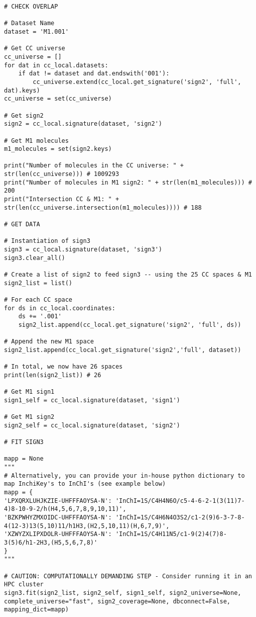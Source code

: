 \begin{lstlisting}
# CHECK OVERLAP

# Dataset Name
dataset = 'M1.001'

# Get CC universe
cc_universe = []
for dat in cc_local.datasets:
    if dat != dataset and dat.endswith('001'):
        cc_universe.extend(cc_local.get_signature('sign2', 'full', dat).keys)
cc_universe = set(cc_universe)

# Get sign2
sign2 = cc_local.signature(dataset, 'sign2')

# Get M1 molecules
m1_molecules = set(sign2.keys)

print("Number of molecules in the CC universe: " + str(len(cc_universe))) # 1009293
print("Number of molecules in M1 sign2: " + str(len(m1_molecules))) # 200
print("Intersection CC & M1: " + str(len(cc_universe.intersection(m1_molecules)))) # 188

# GET DATA

# Instantiation of sign3
sign3 = cc_local.signature(dataset, 'sign3')
sign3.clear_all()

# Create a list of sign2 to feed sign3 -- using the 25 CC spaces & M1
sign2_list = list()

# For each CC space
for ds in cc_local.coordinates:
    ds += '.001'
    sign2_list.append(cc_local.get_signature('sign2', 'full', ds))

# Append the new M1 space
sign2_list.append(cc_local.get_signature('sign2','full', dataset))

# In total, we now have 26 spaces
print(len(sign2_list)) # 26

# Get M1 sign1
sign1_self = cc_local.signature(dataset, 'sign1')

# Get M1 sign2
sign2_self = cc_local.signature(dataset, 'sign2')

# FIT SIGN3

mapp = None
""" 
# Alternatively, you can provide your in-house python dictionary to map InchiKey's to InChI's (see example below)
mapp = { 
'LPXQRXLUHJKZIE-UHFFFAOYSA-N': 'InChI=1S/C4H4N6O/c5-4-6-2-1(3(11)7-4)8-10-9-2/h(H4,5,6,7,8,9,10,11)',
'BZKPWHYZMXOIDC-UHFFFAOYSA-N': 'InChI=1S/C4H6N4O3S2/c1-2(9)6-3-7-8-4(12-3)13(5,10)11/h1H3,(H2,5,10,11)(H,6,7,9)',
'XZWYZXLIPXDOLR-UHFFFAOYSA-N': 'InChI=1S/C4H11N5/c1-9(2)4(7)8-3(5)6/h1-2H3,(H5,5,6,7,8)'
} 
"""

# CAUTION: COMPUTATIONALLY DEMANDING STEP - Consider running it in an HPC cluster
sign3.fit(sign2_list, sign2_self, sign1_self, sign2_universe=None, complete_universe="fast", sign2_coverage=None, dbconnect=False, mapping_dict=mapp)
\end{lstlisting}



